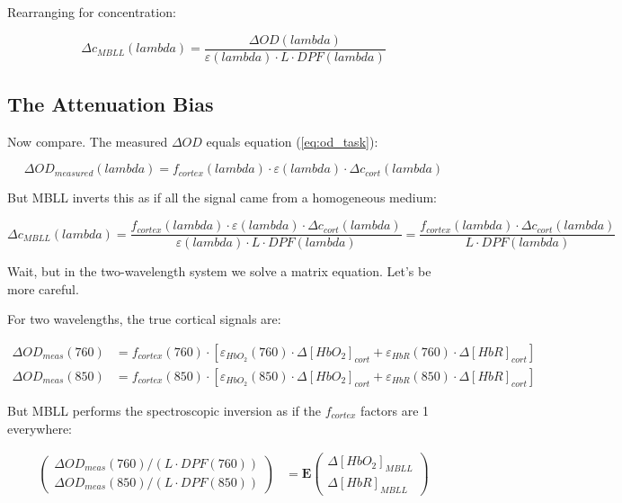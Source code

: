 \documentclass[12pt]{article}
\def\lambda{lambda}%
\def\text#1{#1}%
\begin{document}
Rearranging for concentration:

\begin{equation}
\Delta c_{\text{MBLL}}(\lambda) = \frac{\Delta\text{OD}(\lambda)}{\varepsilon(\lambda) \cdot L \cdot \text{DPF}(\lambda)}
\label{eq:mbll_inversion}
\end{equation}

\subsection{The Attenuation Bias}

Now compare. The measured $\Delta\text{OD}$ equals equation (\ref{eq:od_task}):

\begin{equation}
\Delta\text{OD}_{\text{measured}}(\lambda) = f_{\text{cortex}}(\lambda) \cdot \varepsilon(\lambda) \cdot \Delta c_{\text{cort}}(\lambda)
\end{equation}

But MBLL inverts this as if all the signal came from a homogeneous medium:

\begin{equation}
\Delta c_{\text{MBLL}}(\lambda) = \frac{f_{\text{cortex}}(\lambda) \cdot \varepsilon(\lambda) \cdot \Delta c_{\text{cort}}(\lambda)}{\varepsilon(\lambda) \cdot L \cdot \text{DPF}(\lambda)} = \frac{f_{\text{cortex}}(\lambda) \cdot \Delta c_{\text{cort}}(\lambda)}{L \cdot \text{DPF}(\lambda)}
\end{equation}

Wait, but in the two-wavelength system we solve a matrix equation. Let's be more careful.

For two wavelengths, the true cortical signals are:

\begin{align}
\Delta\text{OD}_{\text{meas}}(760) &= f_{\text{cortex}}(760) \cdot \left[ \varepsilon_{\text{HbO}_2}(760) \cdot \Delta[\text{HbO}_2]_{\text{cort}} + \varepsilon_{\text{HbR}}(760) \cdot \Delta[\text{HbR}]_{\text{cort}} \right] \\
\Delta\text{OD}_{\text{meas}}(850) &= f_{\text{cortex}}(850) \cdot \left[ \varepsilon_{\text{HbO}_2}(850) \cdot \Delta[\text{HbO}_2]_{\text{cort}} + \varepsilon_{\text{HbR}}(850) \cdot \Delta[\text{HbR}]_{\text{cort}} \right]
\end{align}

But MBLL performs the spectroscopic inversion as if the $f_{\text{cortex}}$ factors are 1 everywhere:

\begin{align}
\begin{pmatrix} \Delta\text{OD}_{\text{meas}}(760) / (L \cdot \text{DPF}(760)) \\ \Delta\text{OD}_{\text{meas}}(850) / (L \cdot \text{DPF}(850)) \end{pmatrix} &= \mathbf{E} \begin{pmatrix} \Delta[\text{HbO}_2]_{\text{MBLL}} \\ \Delta[\text{HbR}]_{\text{MBLL}} \end{pmatrix}
\end{align}
\end{document}
